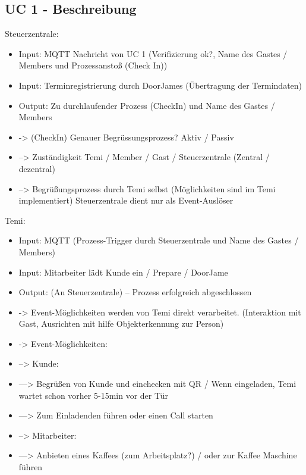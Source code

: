 \subsection*{UC 1 - Beschreibung}
    Steuerzentrale:
    \begin{itemize}
        \item Input: MQTT Nachricht von UC 1 (Verifizierung ok?, Name des Gastes / Members und Prozessanstoß (Check In))
        \item Input: Terminregistrierung durch DoorJames (Übertragung der Termindaten) 
        \item Output: Zu durchlaufender Prozess (CheckIn) und Name des Gastes / Members
        \item -> (CheckIn) Genauer Begrüssungsprozess? Aktiv / Passiv 
        \item --> Zuständigkeit Temi / Member / Gast / Steuerzentrale (Zentral / dezentral)
        \item --> Begrüßungsprozess durch Temi selbst (Möglichkeiten sind im Temi implementiert) Steuerzentrale dient nur als Event-Auslöser 
    \end{itemize}
	
    Temi: 
    \begin{itemize}
        \item Input: MQTT (Prozess-Trigger durch Steuerzentrale und Name des Gastes / Members)
        \item Input: Mitarbeiter lädt Kunde ein / Prepare / DoorJame
        \item Output: (An Steuerzentrale) – Prozess erfolgreich abgeschlossen
        \item -> Event-Möglichkeiten werden von Temi direkt verarbeitet. (Interaktion mit Gast, Ausrichten mit hilfe Objekterkennung zur Person) 
        \item -> Event-Möglichkeiten: 
        \item --> Kunde: 
        \item ---> Begrüßen von Kunde und einchecken mit QR / Wenn eingeladen, Temi wartet schon vorher 5-15min vor der Tür
        \item ---> Zum Einladenden führen oder einen Call starten
        \item --> Mitarbeiter: 
        \item ---> Anbieten eines Kaffees (zum Arbeitsplatz?) / oder zur Kaffee Maschine führen
    \end{itemize}

